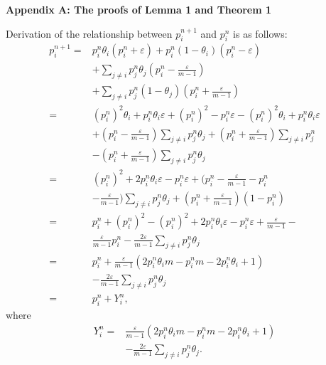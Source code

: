 \documentclass[10pt,journal,cspaper,compsoc,onecolumn]{IEEEtran}
\begin{document}
\begin{spacing}{1.3}

\large{\textbf{Appendix A: The proofs of Lemma 1 and Theorem 1}}

Derivation of the relationship between $p_i^{n + 1}$ and $p_i^{n}$ is as follows:
\begin{equation}
    \label{eq:7}
    \begin{split}
    p_i^{n + 1} = &p_i^n\theta_i(p_i^n + \varepsilon) + p_i^n(1-\theta_i)(p_i^n - \varepsilon)\\
    &+ \sum_{j \neq i}p_j^n\theta_j(p_i^n - \displaystyle \frac{\varepsilon}{m- 1})\\
    &+ \sum_{j \neq i}p_j^n(1 - \theta_j)(p_i^n + \displaystyle\frac{\varepsilon}{m - 1})\\
    =&(p_i^n)^2\theta_i + p_i^n\theta_i\varepsilon + (p_i^n)^2 - p_i^n\varepsilon - (p_i^n)^2\theta_i + p_i^n\theta_i\varepsilon\\
    & + (p_i^n - \displaystyle\frac{\varepsilon}{m - 1})\sum_{j \neq i}p_j^n\theta_j + (p_i^n + \displaystyle\frac{\varepsilon}{m - 1})\sum_{j \neq i}p_j^n\\
    &- (p_i^n + \displaystyle\frac{\varepsilon}{m - 1})\sum_{j \neq i}p_j^n\theta_j\\
    =&(p_i^n)^2 + 2p_i^n\theta_i\varepsilon - p_i^n\varepsilon + (p_i^n - \displaystyle\frac{\varepsilon}{m - 1} - p_i^n \\
    &- \displaystyle\frac{\varepsilon}{m - 1})\sum_{j \neq i}p_j^n\theta_j + (p_i^n + \displaystyle\frac{\varepsilon}{m - 1})(1 - p_i^n)\\
    =&p_i^n + (p_i^n)^2 - (p_i^n)^2 + 2p_i^n\theta_i\varepsilon - p_i^n\varepsilon + \displaystyle\frac{\varepsilon}{m - 1} - \\
    &\displaystyle\frac{\varepsilon}{m - 1}p_i^n - \displaystyle\frac{2\varepsilon}{m - 1}\sum_{j \neq i}p_j^n\theta_j\\
    =&p_i^n + \displaystyle\frac{\varepsilon}{m - 1}(2p_i^n\theta_im - p_i^nm - 2p_i^n\theta_i + 1 )\\
    &- \displaystyle\frac{2\varepsilon}{m-1}\sum_{j \neq i}p_j^n\theta_j\\
    =&p_i^n + Y_i^n,
    \end{split}
\end{equation}
where
\begin{equation}
    \begin{split}
    \label{eq:yi}
    Y_i^n = &\displaystyle\frac{\varepsilon}{m - 1}(2p_i^n\theta_im - p_i^nm - 2p_i^n\theta_i + 1 )\\
             &- \displaystyle\frac{2\varepsilon}{m-1}\sum_{j \neq i}p_j^n\theta_j.
    \end{split}
 \end{equation}
 

\end{spacing}
\end{document}
